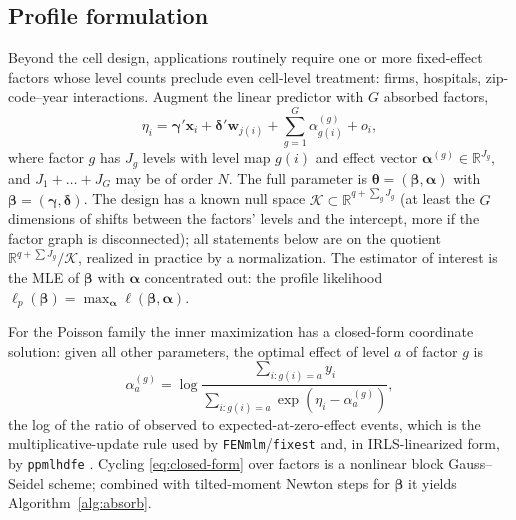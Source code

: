 \documentclass[11pt]{article}
\newcommand{\R}{\mathbb{R}}
\newcommand{\bbeta}{\bm{\beta}}
\newcommand{\bgamma}{\bm{\gamma}}
\newcommand{\bdelta}{\bm{\delta}}
\newcommand{\btheta}{\bm{\theta}}
\newcommand{\balpha}{\bm{\alpha}}
\newcommand{\bx}{\mathbf{x}}
\newcommand{\bw}{\mathbf{w}}
\begin{document}
\subsection{Profile formulation}\label{sec:profile}

Beyond the cell design, applications routinely require one or more
fixed-effect factors whose level counts preclude even cell-level
treatment: firms, hospitals, zip-code--year interactions.  Augment the
linear predictor with $G$ absorbed factors,
\begin{equation}\label{eq:linpred-fe}
\eta_i = \bgamma'\bx_i + \bdelta'\bw_{j(i)} + \sum_{g=1}^{G}
  \alpha^{(g)}_{g(i)} + o_i ,
\end{equation}
where factor $g$ has $J_g$ levels with level map $g(i)$ and effect vector
$\balpha^{(g)} \in \R^{J_g}$, and $J_1 + \dots + J_G$ may be of order
$N$.  The full parameter is
$\btheta = (\bbeta, \balpha)$ with $\bbeta = (\bgamma, \bdelta)$.  The
design has a known null space $\mathcal{K} \subset \R^{q + \sum_g J_g}$
(at least the $G$ dimensions of shifts between the factors' levels and
the intercept, more if the factor graph is disconnected); all statements
below are on the quotient $\R^{q+\sum J_g}/\mathcal{K}$, realized in
practice by a normalization.  The estimator of interest is the MLE of
$\bbeta$ with $\balpha$ concentrated out: the profile likelihood
$\ell_p(\bbeta) = \max_{\balpha} \ell(\bbeta, \balpha)$.

For the Poisson family the inner maximization has a closed-form
coordinate solution: given all other parameters, the optimal effect of
level $a$ of factor $g$ is
\begin{equation}\label{eq:closed-form}
\alpha^{(g)}_a
 = \log \frac{\sum_{i : g(i) = a} y_i}
             {\sum_{i : g(i) = a} \exp\!\left(\eta_i - \alpha^{(g)}_a\right)},
\end{equation}
the log of the ratio of observed to expected-at-zero-effect events, which
is the multiplicative-update rule used by \texttt{FENmlm}/\texttt{fixest}
\citep{berge2018} and, in IRLS-linearized form, by \texttt{ppmlhdfe}
\citep{correia2020}.  Cycling \eqref{eq:closed-form} over factors is a
nonlinear block Gauss--Seidel scheme; combined with tilted-moment Newton
steps for $\bbeta$ it yields Algorithm~\ref{alg:absorb}.
\end{document}
